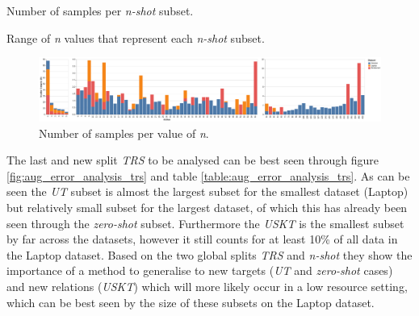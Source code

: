 \begin{table}[ht!]
    \centering
    
    \caption{Number of samples per \textit{n-shot} subset.}
    \label{table:aug_error_analysis_n_shot}
\end{table}

\begin{table}[ht!]
    \centering
    
    \caption{Range of \textit{n} values that represent each \textit{n-shot} subset.}
    \label{table:aug_error_analysis_n_shot_n_relation}
\end{table}

\begin{figure}
    \centering
    \includegraphics[scale=0.3]{images/augmentation/error_analysis/n_shot_low_med_high.png}
    \caption{Number of samples per value of \textit{n}.}
    \label{fig:aug_n_shot_low_med_high}
\end{figure}

The last and new split \textit{TRS} to be analysed can be best seen through figure \ref{fig:aug_error_analysis_trs} and table \ref{table:aug_error_analysis_trs}. As can be seen the \textit{UT} subset is almost the largest subset for the smallest dataset (Laptop) but relatively small subset for the largest dataset, of which this has already been seen through the \textit{zero-shot} subset. Furthermore the \textit{USKT} is the smallest subset by far across the datasets, however it still counts for at least 10\% of all data in the Laptop dataset. Based on the two global splits \textit{TRS} and \textit{n-shot} they show the importance of a method to generalise to new targets (\textit{UT} and \textit{zero-shot} cases) and new relations (\textit{USKT}) which will more likely occur in a low resource setting, which can be best seen by the size of these subsets on the Laptop dataset. 

